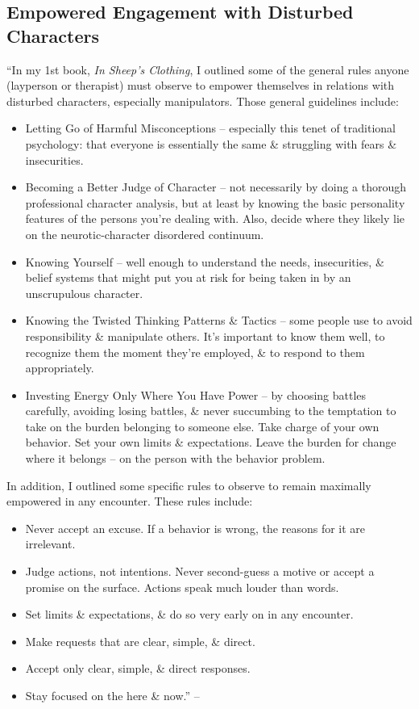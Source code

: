 \documentclass{article}
\numberwithin{equation}{section}
\begin{document}
\subsection{Empowered Engagement with Disturbed Characters}
``In my 1st book, \textit{In Sheep's Clothing}, I outlined some of the general rules anyone (layperson or therapist) must observe to empower themselves in relations with disturbed characters, especially manipulators. Those general guidelines include:
\begin{itemize}
	\item Letting Go of Harmful Misconceptions -- especially this tenet of traditional psychology: that everyone is essentially the same \& struggling with fears \& insecurities.
	\item Becoming a Better Judge of Character -- not necessarily by doing a thorough professional character analysis, but at least by knowing the basic personality features of the persons you're dealing with. Also, decide where they likely lie on the neurotic-character disordered continuum.
	\item Knowing Yourself -- well enough to understand the needs, insecurities, \& belief systems that might put you at risk for being taken in by an unscrupulous character.
	\item Knowing the Twisted Thinking Patterns \& Tactics -- some people use to avoid responsibility \& manipulate others. It's important to know them well, to recognize them the moment they're employed, \& to respond to them appropriately.
	\item Investing Energy Only Where You Have Power -- by choosing battles carefully, avoiding losing battles, \& never succumbing to the temptation to take on the burden belonging to someone else. Take charge of your own behavior. Set your own limits \& expectations. Leave the burden for change where it belongs -- on the person with the behavior problem.
\end{itemize}
In addition, I outlined some specific rules to observe to remain maximally empowered in any encounter. These rules include:
\begin{itemize}
	\item Never accept an excuse. If a behavior is wrong, the reasons for it are irrelevant.
	\item Judge actions, not intentions. Never second-guess a motive or accept a promise on the surface. Actions speak much louder than words.
	\item Set limits \& expectations, \& do so very early on in any encounter.
	\item Make requests that are clear, simple, \& direct.
	\item Accept only clear, simple, \& direct responses.
	\item Stay focused on the here \& now.'' -- \cite[pp. 206--207]{Simon2011}
\end{itemize}
\end{document}
